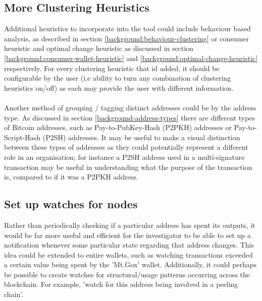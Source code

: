 \subsection{More Clustering Heuristics}
Additional heuristics to incorporate into the tool could include behaviour based analysis, as described in section \ref{background:behaviour-clustering} or consumer heuristic and optimal change heuristic as discussed in section 
\ref{background:consumer-wallet-heuristic} and \ref{background:optimal-change-heuristic} respectively. For every clustering heuristic that id added, it should be configurable by the user (i.e ability to turn any combination of clustering heuristics on/off) as each may provide the user with different information. 
\\\\
Another method of grouping / tagging distinct addresses could be by the address type. As discussed in section \ref{background-address-types} there are different types of Bitcoin addresses, such as Pay-to-PubKey-Hash (P2PKH) addresses or Pay-to-Script-Hash (P2SH) addresses. It may be useful to make a visual distinction between these types of addresses as they could potentially represent a different role in an organisation; for instance a P2SH address used in a multi-signature transaction may be useful in understanding what the purpose of the transaction is, compared to if it was a P2PKH address. 

\subsection{Set up watches for nodes}
Rather than periodically checking if a particular address has spent its outputs, it would be far more useful and efficient for the investigator to be able to set up a notification whenever some particular state regarding that address changes. This idea could be extended to entire wallets, such as watching transactions exceeded a certain value being spent by the 'Mt.Gox' wallet. Additionally, it could perhaps be possible to create watches for structural/usage patterns occurring across the blockchain. For example, 'watch for this address being involved in a peeling chain'. 

